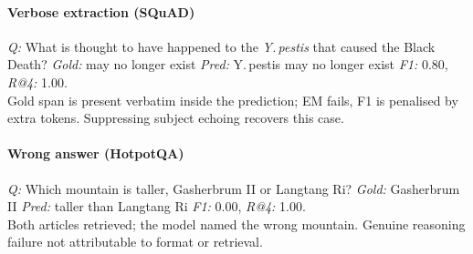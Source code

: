 \documentclass[11pt]{article}
\begin{document}
\paragraph{Verbose extraction (SQuAD)}
\textit{Q:} What is thought to have happened to the \textit{Y.\,pestis} that caused
the Black Death?
\textit{Gold:} may no longer exist \quad
\textit{Pred:} Y.\,pestis may no longer exist \quad
\textit{F1:} 0.80, \textit{R@4:} 1.00.\\
Gold span is present verbatim inside the prediction; EM fails, F1 is penalised by
extra tokens. Suppressing subject echoing recovers this case.

\paragraph{Wrong answer (HotpotQA)}
\textit{Q:} Which mountain is taller, Gasherbrum II or Langtang Ri?
\textit{Gold:} Gasherbrum II \quad
\textit{Pred:} taller than Langtang Ri \quad
\textit{F1:} 0.00, \textit{R@4:} 1.00.\\
Both articles retrieved; the model named the wrong mountain. Genuine reasoning failure
not attributable to format or retrieval.
\end{document}
